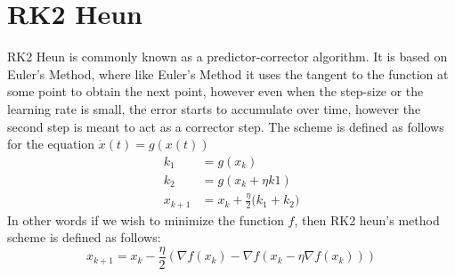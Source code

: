 \section{RK2 Heun}
RK2 Heun is commonly known as a predictor-corrector algorithm. It is based on Euler's Method, where like Euler's Method it uses the tangent to the function at some point to obtain the next point, however even when the step-size or the learning rate is small, the error starts to accumulate over time, however the second step is meant to act as a corrector step. The scheme is defined as follows for the equation $\dot{x}(t) = g(x(t))$
\begin{align*}
k_1 &= g(x_k) \\
k_2 &= g(x_k + \eta k1) \\
x_{k + 1} &= x_{k} + \frac{\eta}{2} \big( k_1 + k_2 \big)
\end{align*}
In other words if we wish to minimize the function $f$, then RK2 heun's method scheme is defined as follows:
\begin{equation*}
x_{k + 1} = x_{k} - \frac{\eta}{2} (\nabla f(x_k) - \nabla f(x_k - \eta \nabla f(x_k)))
\end{equation*}

